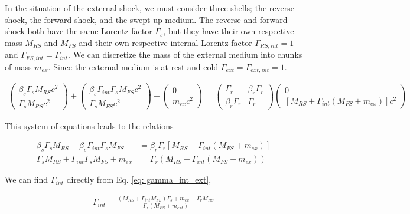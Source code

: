\documentclass[linenumbers,twocolumn]{aastex631}
\begin{document}
\begin{appendix}
In the situation of the external shock, we must consider three shells; the reverse shock, the forward shock, and the swept up medium. The reverse and forward shock both have the same Lorentz factor $\Gamma_s$, but they have their own respective mass $M_{RS}$ and $M_{FS}$ and their own respective internal Lorentz factor $\Gamma_{RS,int} = 1$ and $\Gamma_{FS,int} = \Gamma_{int}$. We can discretize the mass of the external medium into chunks of mass $m_{ex}$. Since the external medium is at rest and cold $\Gamma_{ext} = \Gamma_{ext,int} = 1$.

\begin{align}
	\begin{pmatrix}
	\beta_s\Gamma_s M_{RS} c^2\\
	\Gamma_s M_{RS} c^2
	\end{pmatrix}
	+
	\begin{pmatrix}
	\beta_s\Gamma_{int}\Gamma_s M_{FS} c^2 \\
	\Gamma_s M_{FS} c^2
	\end{pmatrix}
	+
	\begin{pmatrix}
	0 \\
	m_{ex} c^2
	\end{pmatrix}
	=
	\begin{pmatrix}
	\Gamma_r & \beta_r\Gamma_r\\
	\beta_r\Gamma_r & \Gamma_r
	\end{pmatrix}
	\begin{pmatrix}
	0 \\
	[M_{RS} + \Gamma_{int}(M_{FS} + m_{ex}) ]c^2
	\end{pmatrix}
\end{align}

This system of equations leads to the relations

\begin{align}
	\beta_s\Gamma_sM_{RS} + \beta_s\Gamma_{int}\Gamma_sM_{FS} &= \beta_r\Gamma_r[M_{RS} + \Gamma_{int}(M_{FS}+m_{ex})] \label{eq: gamma_r_ext}\\
	\Gamma_sM_{RS} + \Gamma_{int}\Gamma_sM_{FS} + m_{ex} &= \Gamma_r (M_{RS} + \Gamma_{int}(M_{FS}+m_{ex})) \label{eq: gamma_int_ext}
\end{align}

We can find $\Gamma_{int}$ directly from Eq. \ref{eq: gamma_int_ext},

\begin{align}
	\Gamma_{int} = \frac{(M_{RS} + \Gamma_{int}M_{FS})\Gamma_s + m_{ex} - \Gamma_rM_{RS}}{\Gamma_r(M_{FS}+m_{ext})}
\end{align}


\end{appendix}
\end{document}

